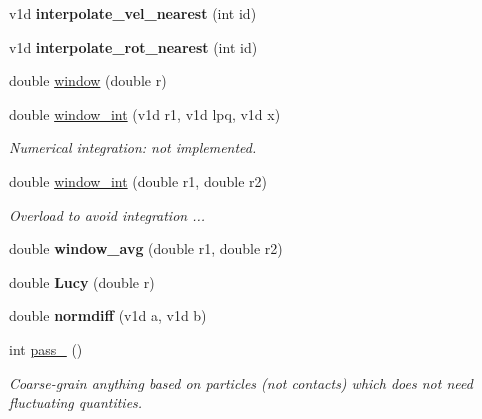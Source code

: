 \begin{DoxyCompactItemize}
v1d {\bfseries interpolate\+\_\+vel\+\_\+nearest} (int id)
\item 
\mbox{\label{classCoarsing_a3a8756a170e75cea83e9dddfe5b2fe57}} 
v1d {\bfseries interpolate\+\_\+rot\+\_\+nearest} (int id)
\item 
double \hyperlink{classCoarsing_ae58a2ff869a21d6590983c47f45c302f}{window} (double r)
\item 
\mbox{\label{classCoarsing_a9e816e036f21344f6cbce59f915a378c}} 
double \hyperlink{classCoarsing_a9e816e036f21344f6cbce59f915a378c}{window\+\_\+int} (v1d r1, v1d lpq, v1d x)
\begin{DoxyCompactList}\small\item\em Numerical integration\+: not implemented. \end{DoxyCompactList}\item 
\mbox{\label{classCoarsing_a592f32474e5d1780964dbc963590b888}} 
double \hyperlink{classCoarsing_a592f32474e5d1780964dbc963590b888}{window\+\_\+int} (double r1, double r2)
\begin{DoxyCompactList}\small\item\em Overload to avoid integration ... \end{DoxyCompactList}\item 
\mbox{\label{classCoarsing_a710e52466854458219f2187059d003e4}} 
double {\bfseries window\+\_\+avg} (double r1, double r2)
\item 
\mbox{\label{classCoarsing_a7c0f9ee3ec935f461c6af5e2d8ff407d}} 
double {\bfseries Lucy} (double r)
\item 
\mbox{\label{classCoarsing_a0439f0c3d74f73da7d6942508ef55d0b}} 
double {\bfseries normdiff} (v1d a, v1d b)
\item 
\mbox{\label{classCoarsing_a41a64f445a65ae8fa6355cf75e095779}} 
int \hyperlink{classCoarsing_a41a64f445a65ae8fa6355cf75e095779}{pass\+\_} ()
\begin{DoxyCompactList}\small\item\em Coarse-\/grain anything based on particles (not contacts) which does not need fluctuating quantities. \end{DoxyCompactList}\item 

\end{DoxyCompactItemize}
